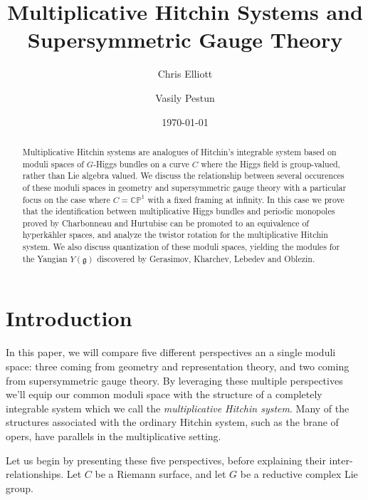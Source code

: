 \documentclass[11pt, oneside, reqno]{amsart}
\title{Multiplicative Hitchin Systems and Supersymmetric Gauge Theory}
\author{Chris Elliott \and Vasily Pestun}
\date{\today}
\theoremstyle{definition} \newtheorem{definition}{Definition}[section]
\theoremstyle{definition} \newtheorem{remark}[definition]{Remark}
\theoremstyle{definition} \newtheorem{remarks}[definition]{Remarks}
\theoremstyle{definition} \newtheorem{question}[definition]{Question}
\theoremstyle{definition} \newtheorem*{note}{Note}
\theoremstyle{definition} \newtheorem{example}[definition]{Example}
\theoremstyle{definition} \newtheorem{examples}[definition]{Examples}
\renewcommand{\gg}{\mathfrak{g}}
\newcommand{\bb}[1]{\mathbb{#1}}
\begin{document}
\maketitle 
\begin{abstract}
Multiplicative Hitchin systems are analogues of Hitchin's integrable system based on moduli spaces of $G$-Higgs bundles on a curve $C$ where the Higgs field is group-valued, rather than Lie algebra valued.  We discuss the relationship between several occurences of these moduli spaces in geometry and supersymmetric gauge theory with a particular focus on the case where $C = \bb{CP}^1$ with a fixed framing at infinity.  In this case we prove that the identification between multiplicative Higgs bundles and periodic monopoles proved by Charbonneau and Hurtubise can be promoted to an equivalence of hyperk\"ahler spaces, and analyze the twistor rotation for the multiplicative Hitchin system.  We also discuss quantization of these moduli spaces, yielding the modules for the Yangian $Y(\gg)$ discovered by Gerasimov, Kharchev, Lebedev and Oblezin.
\end{abstract}

\section{Introduction}

In this paper, we will compare five different perspectives an a single moduli space: three coming from geometry and representation theory, and two coming from supersymmetric gauge theory.  By leveraging these multiple perspectives we'll equip our common moduli space with the structure of a completely integrable system which we call the \emph{multiplicative Hitchin system}.  Many of the structures associated with the ordinary Hitchin system, such as the brane of opers, have parallels in the multiplicative setting.  

Let us begin by presenting these five perspectives, before explaining their inter-relationships.  Let $C$ be a Riemann surface, and let $G$ be a reductive complex Lie group.



\end{document}
